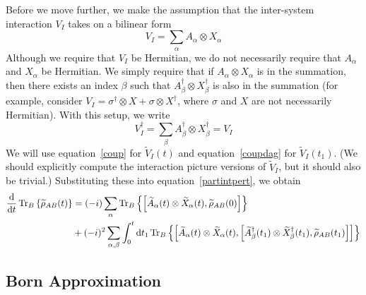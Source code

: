 \documentclass{article}
\newcommand{\ten}{\otimes}
\newcommand{\Ptra}[2]{\Tr_{#1}\left\{#2\right\}}
\newcommand{\til}[1]{\widetilde{#1}}
\begin{document}
Before we move further, we make the assumption that the inter-system interaction $V_I$ takes on a bilinear form
\begin{equation}\label{coup}
V_I = \sum_{\alpha} A_{\alpha}\ten X_{\alpha}
\end{equation}
Although we require that $V_I$ be Hermitian, we do not necessarily require that $A_{\alpha}$ and $X_{\alpha}$ be Hermitian. We simply require that if $A_{\alpha}\ten X_{\alpha}$ is in the summation, then there exists an index $\beta$ such that $A_{\beta}^{\dag}\ten X_{\beta}^{\dag}$ is also in the summation (for example, consider $V_I = \sigma^{\dag}\ten X + \sigma\ten X^{\dag}$, where $\sigma$ and $X$ are not necessarily Hermitian). With this setup, we write
\begin{equation}\label{coupdag}
V_I^{\dag} = \sum_{\beta} A_{\beta}^{\dag}\ten X_{\beta}^{\dag} = V_I
\end{equation}
We will use equation~\ref{coup} for $\til{V}_I(t)$ and equation~\ref{coupdag} for $\til{V}_I(t_1)$. (We should explicitly compute the interaction picture versions of $\til{V}_I$, but it should also be trivial.) Substituting these into equation~\ref{partintpert}, we obtain
\begin{align}\label{ugh}
\begin{split}
\dv{t}\Ptra{B}{\til{\rho}_{AB}(t)} &= (-i)\sum_{\alpha}\Ptra{B}{\comm{\til{A}_{\alpha}(t)\ten\til{X}_{\alpha}(t)}{\til{\rho}_{AB}(0)}}\\
&+ (-i)^2\sum_{\alpha,\beta}\int_0^{t}\dd{t_1}\Ptra{B}{\comm{\til{A}_{\alpha}(t)\ten\til{X}_{\alpha}(t)}{\comm{\til{A}^{\dag}_{\beta}(t_1)\ten\til{X}_{\beta}^{\dag}(t_1)}{\til{\rho}_{AB}(t_1)}}}
\end{split}
\end{align}

\subsection{Born Approximation}
\end{document}
